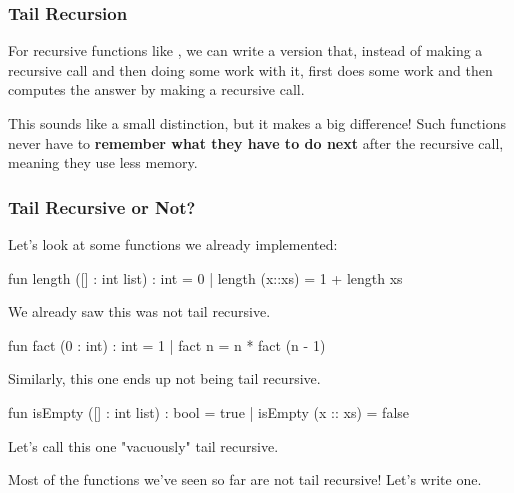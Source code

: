 \documentclass[aspectratio=169, handout]{beamer}
\begin{document}
\begin{frame}[fragile]
  \frametitle{Tail Recursion}

  For recursive functions like , we can write a version that, instead of making a
  recursive call and then doing some work with it, first does some work and then computes the
  answer by making a recursive call.

  \pause
  \vspace{\fill}

  This sounds like a small distinction, but it makes a big difference! Such functions never have
  to \textbf{remember what they have to do next} after the recursive call, meaning they use less
  memory.

  \pause
  \vspace{\fill}

\end{frame}

\begin{frame}[fragile]
  \frametitle{Tail Recursive or Not?}

  Let's look at some functions we already implemented:

  \pause
  \begin{codeblock}
    fun length ([] : int list) : int = 0
      | length (x::xs) = 1 + length xs
  \end{codeblock}

  \pause
  We already saw this was not tail recursive.

  \pause
  \begin{codeblock}
    fun fact (0 : int) : int = 1
      | fact n = n * fact (n - 1)
  \end{codeblock}

  \pause
  Similarly, this one ends up not being tail recursive.

  \pause
  \begin{codeblock}
    fun isEmpty ([] : int list) : bool = true
      | isEmpty (x :: xs) = false
  \end{codeblock}

  \pause
  Let's call this one "vacuously" tail recursive.

  \pause
  \vspace{\fill}

  Most of the functions we've seen so far are not tail recursive! Let's write one.
\end{frame}
\end{document}
